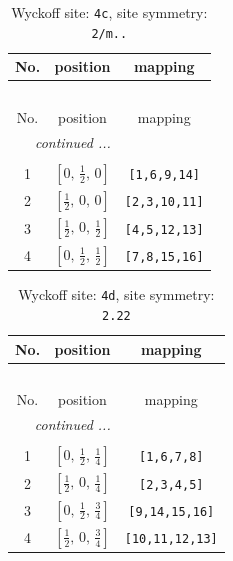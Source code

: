 \documentclass[fleqn,8pt]{jsarticle}
\begin{document}
\renewcommand{\arraystretch}{1.2}
\begin{longtable}{ccc}
\caption{Wyckoff site: {\tt 4c}, site symmetry: {\tt 2/m..}}
 \\
 \hline \hline
No. & position & mapping \\ \hline \endfirsthead

\multicolumn{2}{l}{\tablename\ \thetable{}} \\
 \hline \hline
No. & position & mapping \\ \hline \endhead

 \hline \hline
\multicolumn{2}{r}{\footnotesize\it continued ...} \\ \endfoot

 \hline \hline
\multicolumn{2}{r}{} \\ \endlastfoot

1 & $\left[ 0,\, \frac{1}{2},\, 0 \right]$ & {\tt [1,6,9,14]} \\ \hline
2 & $\left[ \frac{1}{2},\, 0,\, 0 \right]$ & {\tt [2,3,10,11]} \\ \hline
3 & $\left[ \frac{1}{2},\, 0,\, \frac{1}{2} \right]$ & {\tt [4,5,12,13]} \\ \hline
4 & $\left[ 0,\, \frac{1}{2},\, \frac{1}{2} \right]$ & {\tt [7,8,15,16]} \\
\end{longtable}
\renewcommand{\arraystretch}{1.2}
\begin{longtable}{ccc}
\caption{Wyckoff site: {\tt 4d}, site symmetry: {\tt 2.22}}
 \\
 \hline \hline
No. & position & mapping \\ \hline \endfirsthead

\multicolumn{2}{l}{\tablename\ \thetable{}} \\
 \hline \hline
No. & position & mapping \\ \hline \endhead

 \hline \hline
\multicolumn{2}{r}{\footnotesize\it continued ...} \\ \endfoot

 \hline \hline
\multicolumn{2}{r}{} \\ \endlastfoot

1 & $\left[ 0,\, \frac{1}{2},\, \frac{1}{4} \right]$ & {\tt [1,6,7,8]} \\ \hline
2 & $\left[ \frac{1}{2},\, 0,\, \frac{1}{4} \right]$ & {\tt [2,3,4,5]} \\ \hline
3 & $\left[ 0,\, \frac{1}{2},\, \frac{3}{4} \right]$ & {\tt [9,14,15,16]} \\ \hline
4 & $\left[ \frac{1}{2},\, 0,\, \frac{3}{4} \right]$ & {\tt [10,11,12,13]} \\
\end{longtable}
\end{document}

